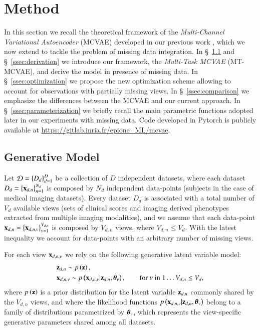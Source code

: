 \section{Method}
\label{sec:method}

In this section we recall the theoretical framework of the \textit{Multi-Channel Variational Autoencoder} (MCVAE) developed in our previous work \citep{Antelmi2019}, which we now extend to tackle the problem of missing data integration.
In \S~\ref{ssec:generative_model} and \S~\ref{ssec:derivation} we introduce our framework, the \textit{Multi-Task MCVAE} (MT-MCVAE), and derive the model in presence of missing data.
In \S~\ref{ssec:optimization} we propose the new optimization scheme allowing to account for observations with partially missing views.
In \S~\ref{ssec:comparison} we emphasize the differences between the MCVAE and our current approach.
In \S~\ref{ssec:parameterization} we briefly recall the main parametric functions adopted later in our experiments with missing data.
Code developed in Pytorch \citep{Paszke2019} is publicly available at \url{https://gitlab.inria.fr/epione\_ML/mcvae}.

\subsection{Generative Model}
\label{ssec:generative_model}

Let $\mathcal{D} = \left\{D_d\right\}_{d=1}^D$ be a collection of $D$ independent datasets, where each dataset $D_d = \left\{\mathbf{x}_{d,n}\right\}_{n=1}^{N_d}$ is composed by $N_d$ independent data-points (\eg subjects in the case of medical imaging datasets).
Every dataset $D_d$ is associated with a total number of $V_d$ available views
(\eg sets of clinical scores and imaging derived phenotypes extracted from multiple imaging modalities),
and we assume that each data-point $\mathbf{x}_{d,n} = \left\{\mathbf{x}_{d,n,v}\right\}_{v=1}^{V_{d,n}}$ is composed by $V_{d,n}$ views,
where $V_{d,n} \leq V_d$.
With the latest inequality we account for data-points with an arbitrary number of missing views.

For each view $\mathbf{x}_{d,n,v}$ we rely on the following generative latent variable model:
\begin{equation}\label{eq:model}
\begin{aligned}
&\z_{d,n} \sim \p{\z}, \\  %
&\xdnv \sim \p{\xdnv|\z_{d,n},\thetab_v},  %
\qquad \textnormal {for} \; v \; \textnormal{in} \; 1 \ldots V_{d,n} \leq V_d,
\end{aligned}
\end{equation}
where $p\left(\mathbf{z}\right)$ is a prior distribution for the latent variable $\mathbf{z}_{d,n}$ commonly shared by the $V_{d,n}$ views, and
where the likelihood functions $p\left(\mathbf{x}_{d,n,v}|\mathbf{z}_{d,n},\boldsymbol{\theta}_v\right)$ belong to a family of distributions parametrized by $\boldsymbol{\theta}_v$, which represents the view-specific generative parameters shared among all datasets.

